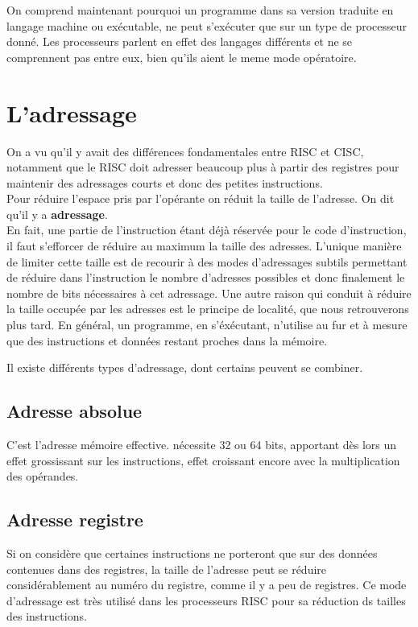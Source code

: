 \documentclass{report}
\begin{document}
On comprend maintenant pourquoi un programme dans sa version traduite en langage machine ou exécutable, ne peut s'exécuter que sur un type de processeur donné. Les processeurs parlent en effet des langages différents et ne se comprennent pas entre eux, bien qu'ils aient le meme mode opératoire.

\section{L'adressage}

On a vu qu'il y avait des différences fondamentales entre RISC et CISC, notamment que le RISC doit adresser beaucoup plus à partir des registres pour maintenir des adressages courts et donc des petites instructions.\\


Pour réduire l'espace pris par l'opérante on réduit la taille de l'adresse. On dit qu'il y a {\bf adressage}.\\ En fait, une partie de l'instruction étant déjà réservée pour le code d'instruction, il faut s'efforcer de réduire au maximum la taille des adresses. L'unique manière de limiter cette taille est de recourir à des modes d'adressages subtils permettant de réduire dans l'instruction le nombre d'adresses possibles et donc finalement le nombre de bits nécessaires à cet adressage. Une autre raison qui conduit à réduire la taille occupée par les adresses est le principe de localité, que nous retrouverons plus tard. En général, un programme, en s'éxécutant, n'utilise au fur et à mesure que des instructions et données restant proches dans la mémoire.



Il existe différents types d'adressage, dont certains peuvent se combiner.\\

\subsection{Adresse absolue} 
C'est l'adresse mémoire effective. nécessite 32 ou 64 bits, apportant dès lors un effet grossissant sur les instructions, effet croissant encore avec la multiplication des opérandes.\\
\subsection{Adresse registre}
Si on considère que certaines instructions ne porteront que sur des données contenues dans des registres, la taille de l'adresse peut se réduire considérablement au numéro du registre, comme il y a peu de registres. Ce mode d'adressage est très utilisé dans les processeurs RISC pour sa réduction ds tailles des instructions.\\
\end{document}
